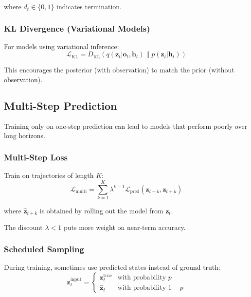 where $d_t \in \{0, 1\}$ indicates termination.

\subsubsection{KL Divergence (Variational Models)}

For models using variational inference:
\begin{equation}
\mathcal{L}_{\text{KL}} = D_{\text{KL}}(q(\mathbf{z}_t | \mathbf{o}_t, \mathbf{h}_t) \| p(\mathbf{z}_t | \mathbf{h}_t))
\end{equation}

This encourages the posterior (with observation) to match the prior (without observation).

\subsection{Multi-Step Prediction}

Training only on one-step prediction can lead to models that perform poorly over long horizons.

\subsubsection{Multi-Step Loss}

Train on trajectories of length $K$:
\begin{equation}
\mathcal{L}_{\text{multi}} = \sum_{k=1}^{K} \lambda^{k-1} \mathcal{L}_{\text{pred}}(\mathbf{z}_{t+k}, \hat{\mathbf{z}}_{t+k})
\end{equation}

where $\hat{\mathbf{z}}_{t+k}$ is obtained by rolling out the model from $\mathbf{z}_t$.

The discount $\lambda < 1$ puts more weight on near-term accuracy.

\subsubsection{Scheduled Sampling}

During training, sometimes use predicted states instead of ground truth:
\begin{equation}
\mathbf{z}_t^{\text{input}} = \begin{cases}
\mathbf{z}_t^{\text{true}} & \text{with probability } p \\
\hat{\mathbf{z}}_t & \text{with probability } 1-p
\end{cases}
\end{equation}

